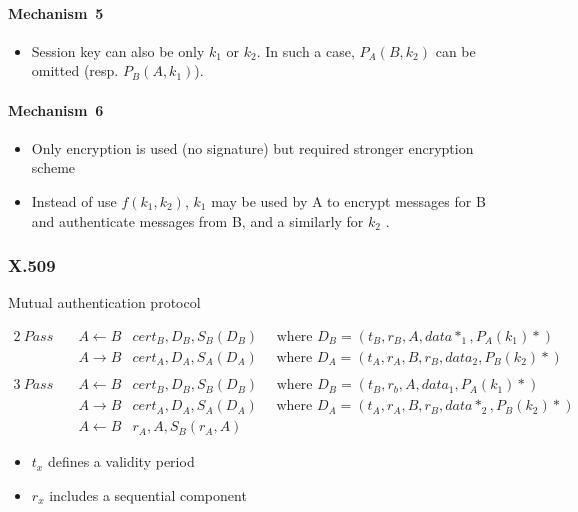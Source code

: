 \paragraph{Mechanism~5} 
\begin{itemize} 
        \item Session key can also be only $k_1$ or $k_2$.
In such a case, $P_A(B, k_2)$ can be omitted (resp. $P_B (A, k_1 )$).
\end{itemize}

\paragraph{Mechanism~6}
\begin{itemize}
    \item Only encryption is used (no signature) but required stronger
        encryption scheme
    \item Instead of use $f(k_1, k_2)$, $k_1$ may be used by A to encrypt messages for B and
        authenticate messages from B, and a similarly for $k_2$ .
\end{itemize}

\subsubsection{X.509}
Mutual authentication protocol

\begin{eqnarray*}
    2~Pass \quad &  A \leftarrow B & cert_B,D_B,S_B(D_B) 
                 \quad \textrm{ where } D_B = ( t_B,r_B,A,data*_1,P_A(k_1)*)\\
                 & A \rightarrow B & cert_A,D_A,S_A(D_A) 
                  \quad \textrm{ where  } D_A =
    (t_A,r_A,B,r_B,data_2,P_B(k_2)* )\\
    \\
    3~Pass \quad &  A \leftarrow B & cert_B,D_B,S_B(D_B) 
        \quad \textrm{ where  } D_B = (t_B,r_b,A,data_1,P_A(k_1)*) \\
        & A \rightarrow B & cert_A,D_A,S_A(D_A) 
        \quad \textrm{ where } D_A = (t_A,r_A,B,r_B,data*_2,P_B(k_2)*)
        \\
        & A \leftarrow B & r_A,A,S_B(r_A,A) 
\end{eqnarray*}

\begin{itemize}
    \item $t_x$ defines a validity period 
    \item  $r_x$ includes a sequential component
\end{itemize}

